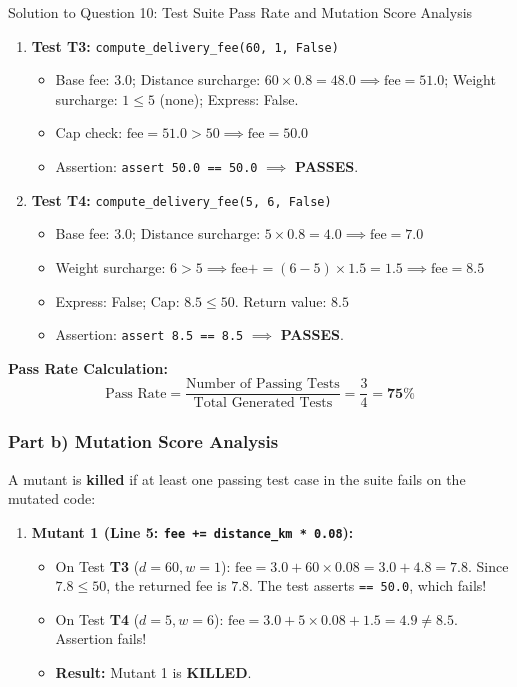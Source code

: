 \documentclass[11pt,a4paper]{article}
\begin{document}
\begin{solutionbox}{Solution to Question 10: Test Suite Pass Rate and Mutation Score Analysis}
\begin{enumerate}[label=\textbf{\arabic*.}]
    \item \textbf{Test T3:} \texttt{compute\_delivery\_fee(60, 1, False)}
    \begin{itemize}[itemsep=1pt]
        \item Base fee: $3.0$; Distance surcharge: $60 \times 0.8 = 48.0 \implies \text{fee} = 51.0$; Weight surcharge: $1 \le 5$ (none); Express: False.
        \item Cap check: $\text{fee} = 51.0 > 50 \implies \text{fee} = \mathbf{50.0}$
        \item Assertion: \texttt{assert 50.0 == 50.0} $\implies$ \textcolor{accentgreen}{\textbf{PASSES}}.
    \end{itemize}
    
    \item \textbf{Test T4:} \texttt{compute\_delivery\_fee(5, 6, False)}
    \begin{itemize}[itemsep=1pt]
        \item Base fee: $3.0$; Distance surcharge: $5 \times 0.8 = 4.0 \implies \text{fee} = 7.0$
        \item Weight surcharge: $6 > 5 \implies \text{fee} += (6 - 5) \times 1.5 = 1.5 \implies \text{fee} = \mathbf{8.5}$
        \item Express: False; Cap: $8.5 \le 50$. Return value: $\mathbf{8.5}$
        \item Assertion: \texttt{assert 8.5 == 8.5} $\implies$ \textcolor{accentgreen}{\textbf{PASSES}}.
    \end{itemize}
\end{enumerate}

\textbf{Pass Rate Calculation:}
\begin{equation}
    \text{Pass Rate} = \frac{\text{Number of Passing Tests}}{\text{Total Generated Tests}} = \frac{3}{4} = \mathbf{75\%}
\end{equation}

\subsubsection*{Part b) Mutation Score Analysis}
A mutant is \textbf{killed} if at least one passing test case in the suite fails on the mutated code:
\begin{enumerate}[label=\textbf{\arabic*.}]
    \item \textbf{Mutant 1 (Line 5: \texttt{fee += distance\_km * 0.08}):}
    \begin{itemize}[itemsep=1pt]
        \item On Test \textbf{T3} ($d=60, w=1$): $\text{fee} = 3.0 + 60 \times 0.08 = 3.0 + 4.8 = 7.8$. Since $7.8 \le 50$, the returned fee is $7.8$. The test asserts \texttt{== 50.0}, which fails!
        \item On Test \textbf{T4} ($d=5, w=6$): $\text{fee} = 3.0 + 5 \times 0.08 + 1.5 = 4.9 \ne 8.5$. Assertion fails!
        \item \textbf{Result:} Mutant 1 is \textcolor{accentgreen}{\textbf{KILLED}}.
    \end{itemize}
    

\end{enumerate}
\end{solutionbox}
\end{document}
